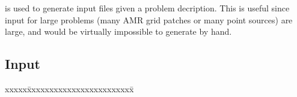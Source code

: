 \documentclass[10pt]{article}
\begin{document}

\section{} \label{ss:hypre-init}

 is used to generate  input files
given a problem decription.  This is useful since 
input for large problems (many AMR grid patches or many point sources)
are large, and would be virtually impossible to generate by hand.

\subsection{Input}

\begin{tabbing}
xxxxx\=xxxxxxxxxxxxxxxxxxxxxxxx\=\kill
\> \todo\  \>  \\
\> \todo\   \\
\> \todo\  \\
\> \todo\  \\
\> \todo\  \>  \\
\> \todo\   \\
\> \todo\   \\
\> \todo\   \\
\end{tabbing}
\end{document}
